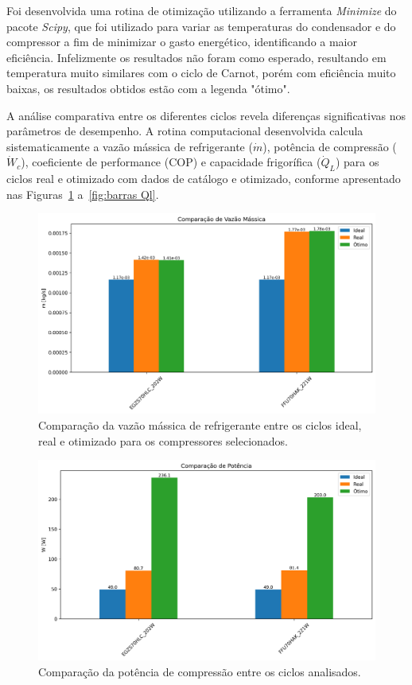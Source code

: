 Foi desenvolvida uma rotina de otimização utilizando a ferramenta \textit{Minimize} do pacote \textit{Scipy}, que foi utilizado para variar as temperaturas do condensador e do compressor a fim de minimizar o gasto energético, identificando a maior eficiência. Infelizmente os resultados não foram como esperado, resultando em temperatura muito similares com o ciclo de Carnot, porém com eficiência muito baixas, os resultados obtidos estão com a legenda "ótimo".


A análise comparativa entre os diferentes ciclos revela diferenças significativas nos parâmetros de desempenho. A rotina computacional desenvolvida calcula sistematicamente a vazão mássica de refrigerante ($\dot{m}$), potência de compressão ($\dot{W}_c$), coeficiente de performance (COP) e capacidade frigorífica ($\dot{Q}_L$) para os ciclos real e otimizado com dados de catálogo e otimizado, conforme apresentado nas Figuras~\ref{fig:barras fluxo massa} a~\ref{fig:barras Ql}.

\begin{figure}[ht]
    \centering
    \includegraphics[width=0.8\linewidth]{Imagens/Desenvolvimento/barras_m.png}
    \caption{Comparação da vazão mássica de refrigerante entre os ciclos ideal, real e otimizado para os compressores selecionados.}
    \label{fig:barras fluxo massa}
\end{figure}

\begin{figure}[ht]
    \centering
    \includegraphics[width=0.8\linewidth]{Imagens/Desenvolvimento/barras_W.png}
    \caption{Comparação da potência de compressão entre os ciclos analisados.}
    \label{fig:barras W}
\end{figure}

